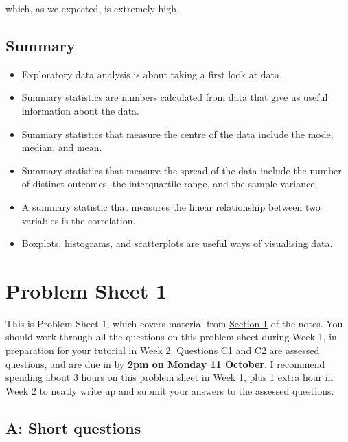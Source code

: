 \documentclass[
  a4paper,
]{book}
\providecommand{\tightlist}{%
  \setlength{\itemsep}{0pt}\setlength{\parskip}{0pt}}
\newif\ifcomm\commtrue
\theoremstyle{definition}
\theoremstyle{definition}
\theoremstyle{definition}
\theoremstyle{definition}
\theoremstyle{remark}
\begin{document}
which, as we expected, is extremely high.

\hypertarget{summary-01}{%
\section*{Summary}\label{summary-01}}

\begin{itemize}
\tightlist
\item
  Exploratory data analysis is about taking a first look at data.
\item
  Summary statistics are numbers calculated from data that give us useful information about the data.
\item
  Summary statistics that measure the centre of the data include the mode, median, and mean.
\item
  Summary statistics that measure the spread of the data include the number of distinct outcomes, the interquartile range, and the sample variance.
\item
  A summary statistic that measures the linear relationship between two variables is the correlation.
\item
  Boxplots, histograms, and scatterplots are useful ways of visualising data.
\end{itemize}

\hypertarget{P1}{%
\chapter*{Problem Sheet 1}\label{P1}}

\commfalse

This is Problem Sheet 1, which covers material from \protect\hyperlink{S01-eda}{Section 1} of the notes. You should work through all the questions on this problem sheet during Week 1, in preparation for your tutorial in Week 2. Questions C1 and C2 are assessed questions, and are due in by \textbf{2pm on Monday 11 October}. I recommend spending about 3 hours on this problem sheet in Week 1, plus 1 extra hour in Week 2 to neatly write up and submit your answers to the assessed questions.

\hypertarget{P1-short}{%
\section*{A: Short questions}\label{P1-short}}
\end{document}
